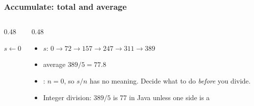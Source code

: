 \documentclass[aspectratio=169,10pt,compress]{beamer}
\begin{document}
\begin{frame}[t,fragile] \frametitle{Accumulate: total and average}
	\begin{columns}[T]
		\begin{column}{0.48\textwidth}
			\SetAlFnt{\small}


\begin{algorithm}[H]
				\caption{Average($a$)}
				$s \gets 0$\;
\end{algorithm}

		\end{column}
		\begin{column}{0.48\textwidth}
			\begin{center}
			\end{center}
			\begin{itemize}\small
				\item $s$: $0 \to 72 \to 157 \to 247 \to 311 \to 389$
				\item average $389 / 5 = 77.8$
				\item {}: $n = 0$, so $s / n$ has no meaning.
				      Decide what to do \emph{before} you divide.
				\item Integer division: $389 / 5$ is 77 in Java unless one side is a 
			\end{itemize}
		\end{column}
	\end{columns}
\end{frame}
\end{document}
